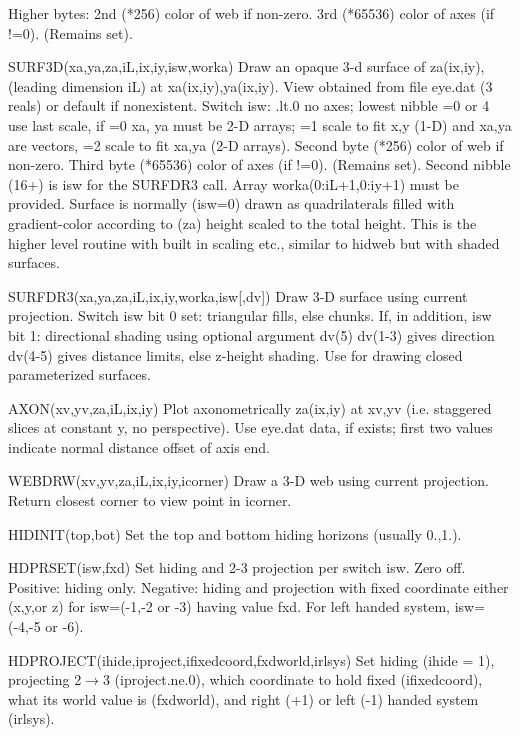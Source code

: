 Higher bytes: {2nd} (*256) color of web if non-zero. {3rd} (*65536) color
of axes (if !=0). (Remains set).

SURF3D(xa,ya,za,iL,ix,iy,isw,worka) Draw an opaque 3-d surface of
za(ix,iy), (leading dimension iL) at xa(ix,iy),ya(ix,iy).  View
obtained from file eye.dat (3 reals) or default if nonexistent. Switch
isw: .lt.0 no axes; lowest nibble =0 or 4 use last scale, if =0 xa, ya
must be 2-D arrays; =1 scale to fit x,y (1-D) and xa,ya are vectors,
=2 scale to fit xa,ya (2-D arrays). Second byte (*256) color of web if
non-zero. Third byte (*65536) color of axes (if !=0). (Remains
set). Second nibble (16+) is isw for the SURFDR3 call. Array
worka(0:iL+1,0:iy+1) must be provided.  Surface is normally (isw=0)
drawn as quadrilaterals filled with gradient-color according to (za)
height scaled to the total height. This is the higher level routine
with built in scaling etc., similar to hidweb but with shaded surfaces.

SURFDR3(xa,ya,za,iL,ix,iy,worka,isw[,dv]) Draw 3-D surface using current
projection. Switch isw bit 0 set: triangular fills, else chunks.  If,
in addition, isw bit 1: directional shading using optional argument
dv(5) dv(1-3) gives direction dv(4-5) gives distance limits, else
z-height shading. Use for drawing closed parameterized surfaces.

AXON(xv,yv,za,iL,ix,iy) Plot axonometrically za(ix,iy) at xv,yv (i.e.
staggered slices at constant y, no perspective).  Use eye.dat data, if
exists; first two values indicate normal distance offset of axis end.

WEBDRW(xv,yv,za,iL,ix,iy,icorner) Draw  a 3-D web using current projection.
Return closest corner to view point in icorner.

HIDINIT(top,bot) Set the top and bottom hiding horizons (usually 0.,1.).

HDPRSET(isw,fxd) Set hiding and 2-3 projection per switch isw. Zero
off.  Positive: hiding only. Negative: hiding and projection with
fixed coordinate either (x,y,or z) for isw=(-1,-2 or -3) having value
fxd. For left handed system, isw=(-4,-5 or -6).

HDPROJECT(ihide,iproject,ifixedcoord,fxdworld,irlsys)
Set hiding (ihide = 1), projecting 2$\rightarrow$3 (iproject.ne.0), which
coordinate to hold fixed (ifixedcoord), what its world value is
(fxdworld), and right (+1) or left (-1) handed system (irlsys).



